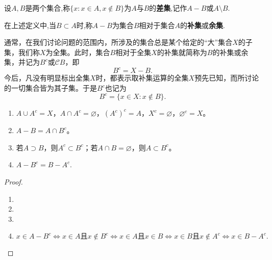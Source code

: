 \documentclass[../../main.tex]{subfiles}
\begin{document}
\begin{definition}
设$A,B$是两个集合,称$\{x:x\in A,x\notin B\}$为$A$与$B$的\textbf{差集},记作$A-B$或$A\setminus B$.

在上述定义中,当$B\subset A$时,称$A-B$为集合$B$相对于集合$A$的\textbf{补集}或\textbf{余集}.

通常，在我们讨论问题的范围内，所涉及的集合总是某个给定的“大”集合\(X\)的子集，我们称\(X\)为全集。此时，集合\(B\)相对于全集\(X\)的补集就简称为\(B\)的补集或余集，并记为\(B^c\)或\(\mathscr{C} B\)，即
\[B^c = X- B.\]
今后，凡没有明显标出全集\(X\)时，都表示取补集运算的全集\(X\)预先已知，而所讨论的一切集合皆为其子集。于是\(B^c\)也记为
\[B^c = \{x\in X:x\notin B\}.\]
\end{definition}

\begin{proposition}[集合的差与补的基本性质]\label{proposition:集合的差与补的基本性质}
\begin{enumerate}[(1)]
\item \(A\cup A^c = X\)，\(A\cap A^c = \varnothing\)，\((A^c)^c = A\)，\(X^c = \varnothing\)，\(\varnothing^c = X\)。

\item\(A- B = A\cap B^c\)。

\item 若\(A\supset B\)，则\(A^c\subset B^c\)；若\(A\cap B = \varnothing\)，则\(A\subset B^c\)。

\item $A-B^c=B-A^c$.
\end{enumerate}
\end{proposition}
\begin{proof}
\begin{enumerate}[(1)]
\item 

\item 

\item 

\item $x\in A-B^c\Longleftrightarrow x\in A\text{且}x\notin B^c\Longleftrightarrow x\in A\text{且}x\in B
\Longleftrightarrow x\in B\text{且}x\notin A^c\Longleftrightarrow x\in B-A^c.$
\end{enumerate}
\end{proof}
\end{document}
